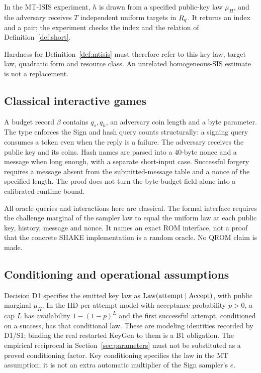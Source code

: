 \begin{definition}\label{def:mtisis}
In the MT-ISIS experiment, $h$ is drawn from a specified public-key law
$\mu_H$, and the adversary receives $T$ independent uniform targets
in $R_q$. It returns an index and a pair; the experiment checks the
index and the  relation of Definition~\ref{def:short}.
\end{definition}
Hardness for Definition~\ref{def:mtisis} must therefore refer to this key law, target law, quadratic
form and resource class. An unrelated homogeneous-SIS estimate is not a
replacement.

\subsection{Classical interactive games}
A budget record $\beta$ contains $q_s,q_h$, an adversary coin length and
a byte parameter. The type  enforces the Sign and hash
query counts structurally: a signing query consumes a token even when
the reply is a failure. The adversary receives the public key and its
coins. Hash names are parsed into a $40$-byte nonce and a message when
long enough, with a separate short-input case. Successful forgery
requires a message absent from the submitted-message table and a nonce
of the specified length. The proof does not turn the byte-budget field
alone into a calibrated runtime bound.

All oracle queries and interactions here are classical. The formal
 interface requires the challenge marginal
of the sampler law to equal the uniform law at each public key, history,
message and nonce. It names an exact ROM interface, not a proof that
the concrete SHAKE implementation is a random oracle. No QROM claim is
made.

\subsection{Conditioning and operational assumptions}
Decision D1 specifies the emitted key law as
$\operatorname{Law}(\text{attempt}\mid\mathrm{Accept})$, with public marginal $\mu_H$.
In the IID per-attempt model with acceptance probability $p>0$, a cap
$L$ has availability $1-(1-p)^L$ and the first successful attempt,
conditioned on a success, has that conditional law. These are modeling
identities recorded by D1/S1; binding the real restarted KeyGen to them
is a B1 obligation. The empirical reciprocal in
Section~\ref{sec:parameters} must not be substituted as a proved
conditioning factor. Key conditioning specifies the law in the MT
assumption; it is not an extra automatic multiplier of the Sign
sampler's $e$.


